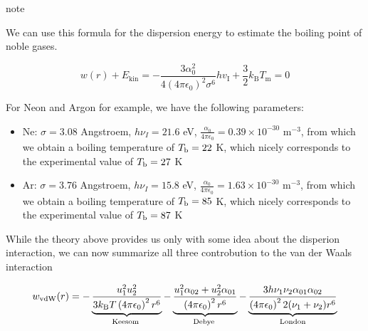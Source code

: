 \documentclass[letterpaper,10pt,english]{sphinxmanual}
\let\sphinxpxdimen\pdfpxdimen\else\newdimen\sphinxpxdimen
\begin{document}
\begin{sphinxadmonition}{note}{}\unskip
\sphinxAtStartPar
{}

\sphinxAtStartPar
We can use this formula for the dispersion energy to estimate the boiling point of noble gases.

\sphinxAtStartPar
\begin{equation}
w(r)+E_{\mathrm{kin}}=-\frac{3 \alpha_{0}^{2}}{4\left(4 \pi \epsilon_{0}\right)^{2} \sigma^{6}} h v_{\mathrm{I}}+\frac{3}{2} k_{\mathrm{B}} T_{\mathrm{m}}=0
\end{equation}

\sphinxAtStartPar
For Neon and Argon for example, we have the following parameters:
\begin{itemize}
\item {} 
\sphinxAtStartPar
Ne: \(\sigma=3.08\) Angstroem, \(h\nu_I=21.6\) eV, \(\frac{\alpha_0}{4\pi \epsilon_0}=0.39\times 10^{-30}\) m\(^{-3}\), from which we obtain a boiling temperature of \(T_{\rm b}=22\) K, which nicely corresponds to the experimental value of \(T_{\rm b}=27\) K

\item {} 
\sphinxAtStartPar
Ar: \(\sigma=3.76\) Angstroem, \(h\nu_I=15.8\) eV, \(\frac{\alpha_0}{4\pi \epsilon_0}=1.63\times 10^{-30}\) m\(^{-3}\), from which we obtain a boiling temperature of \(T_{\rm b}=85\) K, which nicely corresponds to the experimental value of \(T_{\rm b}=87\) K

\end{itemize}
\end{sphinxadmonition}

\noindent\sphinxincludegraphics[width=2302\sphinxpxdimen,height=962\sphinxpxdimen]{{c_disp}.png}

\sphinxAtStartPar
While the theory above provides us only with some idea about the disperion interaction, we can now summarize all three controbution to the van der Waals interaction

\sphinxAtStartPar
\begin{equation}
w_{\rm vdW}(r)=-\underbrace{\frac{u_{1}^{2} u_{2}^{2}}{3 k_{\mathrm{B}} T\left(4 \pi \epsilon_{0} \right)^{2} r^{6}}}_{\text {Keesom }}-\underbrace{\frac{u_{1}^{2} \alpha_{02}+u_{2}^{2} \alpha_{01}}{\left(4 \pi \epsilon_{0} \right)^{2} r^{6}}}_{\text {Debye }}-\underbrace{\frac{3 h\nu_1\nu_2 \alpha_{01} \alpha_{02}}{\left(4 \pi \epsilon_{0} \right)^{2} 2(\nu_1+\nu_2)r^{6}}}_{\text {London} }
\end{equation}
\end{document}
